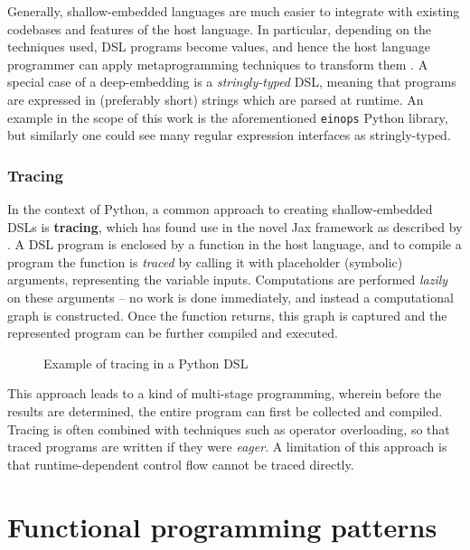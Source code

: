 Generally, shallow-embedded languages are much easier to integrate with existing codebases and features of the host language. In particular, depending on the techniques used, DSL programs become values, and hence the host language programmer can apply metaprogramming techniques to transform them \cite{atkey2009unembedding}. 
A special case of a deep-embedding is a \textit{stringly-typed} DSL, meaning that programs are expressed in (preferably short) strings which are parsed at runtime. An example in the scope of this work is the aforementioned \texttt{einops} Python library, but similarly one could see many regular expression interfaces as stringly-typed.

\subsubsection{Tracing} \label{tracing}

In the context of Python, a common approach to creating shallow-embedded DSLs is \textbf{tracing}, which has found use in the novel Jax framework as described by \textcite{frostig2018compiling}. A DSL program is enclosed by a function in the host language, and to compile a program the function is \textit{traced} by calling it with placeholder (symbolic) arguments, representing the variable inputs. Computations are performed \textit{lazily} on these arguments -- no work is done immediately, and instead a computational graph is constructed. Once the function returns, this graph is captured and the represented program can be further compiled and executed.

\begin{figure}[ht]
    \caption{Example of tracing in a Python DSL}
    \label{fig:tracing}
\end{figure}

This approach leads to a kind of multi-stage programming, wherein before the results are determined, the entire program can first be collected and compiled. Tracing is often combined with techniques such as operator overloading, so that traced programs are written if they were \textit{eager}. A limitation of this approach is that runtime-dependent control flow cannot be traced directly.

\section{Functional programming patterns}

